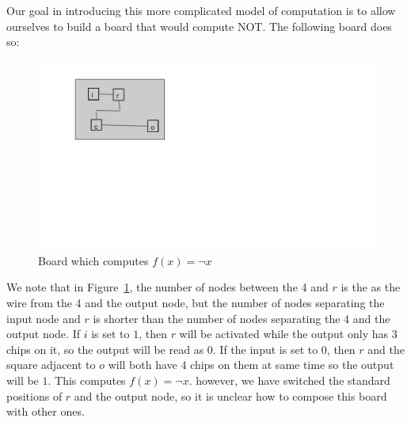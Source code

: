 \documentclass[runningheads,a4paper]{llncs}
\begin{document}









Our goal in introducing this more complicated model of computation is to allow ourselves to build a board that would compute NOT. The following board does so:
\begin{figure}
\centering
\includegraphics[width=0.5\linewidth]{notgate}
\caption{Board which computes $f(x) = \neg x$}
\label{fig:NOT}
\end{figure}
We note that in Figure~\ref{fig:NOT}, the number of nodes between the 4 and $r$ is the as the wire from the 4 and the output node, but the number of nodes separating the input node and $r$ is shorter than the number of nodes separating the 4 and the output node. If $i$ is set to $1$, then $r$ will be activated while the output only has 3 chips on it, so the output will be read as 0. If the input is set to 0, then $r$ and  the square adjacent to $o$ will both have 4 chips on them at same time so the output will be $1$. This computes $f(x) = \neg x$. however, we have switched the standard positions of $r$ and the output node, so it is unclear how to compose this board with other ones. 
\end{document}
